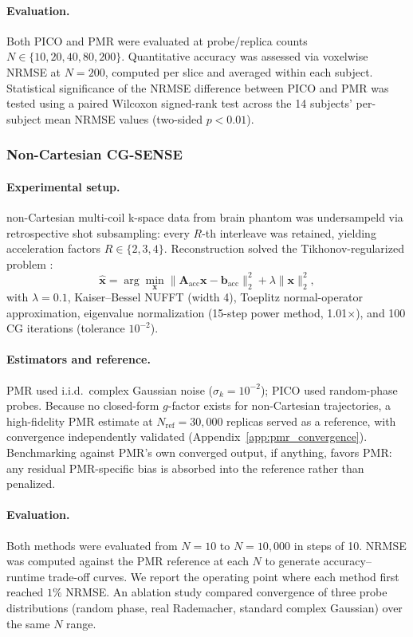\documentclass[AMA,STIX2COL,Linenumberson]{MRM}
\begin{document}
\paragraph{Evaluation.}
Both PICO and PMR were evaluated at probe/replica counts $N \in \{10, 20, 40, 80, 200\}$. Quantitative accuracy was assessed via voxelwise NRMSE at $N=200$, computed per slice and averaged within each subject. Statistical significance of the NRMSE difference between PICO and PMR was tested using a paired Wilcoxon signed-rank test across the 14 subjects' per-subject mean NRMSE values (two-sided $p < 0.01$).

\subsubsection{Non-Cartesian CG-SENSE}

\paragraph{Experimental setup.}
non-Cartesian multi-coil k-space data from brain phantom was undersampeld via retrospective shot subsampling: every $R$-th interleave was retained, yielding acceleration factors $R \in \{2, 3, 4\}$. Reconstruction solved the Tikhonov-regularized problem \cite{Pruessmann2001}:
\[
\hat{\mathbf{x}}=\arg\min_{\mathbf{x}} \|\mathbf{A}_{\mathrm{acc}}\mathbf{x}-\mathbf{b}_{\mathrm{acc}}\|_2^2+\lambda \|\mathbf{x}\|_2^2,
\]
with $\lambda=0.1$, Kaiser--Bessel NUFFT (width 4), Toeplitz normal-operator approximation, eigenvalue normalization (15-step power method, 1.01$\times$), and 100 CG iterations (tolerance $10^{-2}$).

\paragraph{Estimators and reference.}
PMR used i.i.d.\ complex Gaussian noise ($\sigma_k = 10^{-2}$); PICO used random-phase probes. Because no closed-form $g$-factor exists for non-Cartesian trajectories, a high-fidelity PMR estimate at $N_{\mathrm{ref}} = 30{,}000$ replicas served as a reference, with convergence independently validated (Appendix~\ref{app:pmr_convergence}). Benchmarking against PMR's own converged output, if anything, favors PMR: any residual PMR-specific bias is absorbed into the reference rather than penalized.

\paragraph{Evaluation.}
Both methods were evaluated from $N=10$ to $N=10,000$ in steps of 10. NRMSE was computed against the PMR reference at each $N$ to generate accuracy--runtime trade-off curves. We report the operating point where each method first reached $1\%$ NRMSE. An ablation study compared convergence of three probe distributions (random phase, real Rademacher, standard complex Gaussian) over the same $N$ range.
\end{document}
